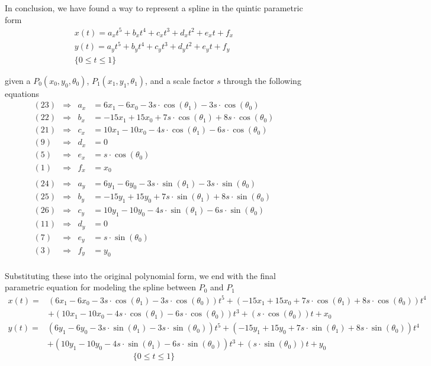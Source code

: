 \documentclass[12pt, letterpaper]{article}
\begin{document}
\newpage 
In conclusion, we have found a way to represent a spline in the quintic parametric form 
\begin{gather*}
x(t) = a_x t^5 + b_x t^4 + c_x t^3 + d_x t^2 + e_x t + f_x \\
y(t) = a_y t^5 + b_y t^4 + c_y t^3 + d_y t^2 + e_y t + f_y \\
\lbrace 0 \leq t \leq 1 \rbrace
\end{gather*}

given a \(P_0(x_0, y_0, \theta_0)\), \(P_1(x_1, y_1, \theta_1)\), and a scale factor \(s\) through the following equations
\begin{align*}
(23) &\Rightarrow & a_x &= 6x_1 - 6x_0 - 3s \cdot \cos(\theta_1) - 3s \cdot \cos(\theta_0) \\
(22) &\Rightarrow & b_x &= -15x_1 + 15x_0 + 7s \cdot \cos(\theta_1) + 8s \cdot \cos(\theta_0) \\
(21) &\Rightarrow & c_x &= 10x_1 - 10x_0 - 4s \cdot \cos(\theta_1) - 6s \cdot \cos(\theta_0) \\
(9) &\Rightarrow & d_x &= 0 \\
(5) &\Rightarrow & e_x &= s \cdot \cos(\theta_0) \\
(1) &\Rightarrow & f_x &= x_0 \\
\\
(24) &\Rightarrow & a_y &= 6y_1 - 6y_0 - 3s \cdot \sin(\theta_1) - 3s \cdot \sin(\theta_0) \\
(25) &\Rightarrow & b_y &= -15y_1 + 15y_0 + 7s \cdot \sin(\theta_1) + 8s \cdot \sin(\theta_0) \\
(26) &\Rightarrow & c_y &= 10y_1 - 10y_0 - 4s \cdot \sin(\theta_1) - 6s \cdot \sin(\theta_0) \\
(11) &\Rightarrow & d_y &= 0 \\
(7) &\Rightarrow & e_y &= s \cdot \sin(\theta_0) \\
(3) &\Rightarrow & f_y &= y_0 \\
\end{align*}

Substituting these into the original polynomial form, we end with the final parametric equation for modeling the spline between \(P_0\) and \(P_1\)
\begin{equation*}				
\begin{split}
x(t) = &(6x_1 - 6x_0 - 3s \cdot \cos(\theta_1) - 3s \cdot \cos(\theta_0))t^5 + (-15x_1 + 15x_0 + 7s \cdot \cos(\theta_1) + 8s \cdot \cos(\theta_0))t^4 \\ 
&+ (10x_1 - 10x_0 - 4s \cdot \cos(\theta_1) - 6s \cdot \cos(\theta_0))t^3 + (s \cdot \cos(\theta_0))t + x_0
\end{split}
\end{equation*}
\begin{equation*}
\begin{split}
y(t) = &(6y_1 - 6y_0 - 3s \cdot \sin(\theta_1) - 3s \cdot \sin(\theta_0))t^5 + (-15y_1 + 15y_0 + 7s \cdot \sin(\theta_1) + 8s \cdot \sin(\theta_0))t^4 \\
&+ (10y_1 - 10y_0 - 4s \cdot \sin(\theta_1) - 6s \cdot \sin(\theta_0))t^3 + (s \cdot \sin(\theta_0))t + y_0
\end{split}
\end{equation*}
\[\lbrace 0 \leq t \leq 1 \rbrace\]
\end{document}
